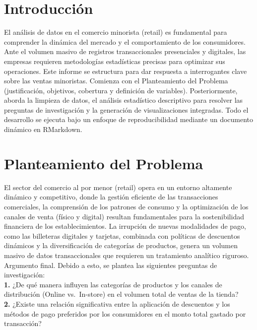 \documentclass[oneside,11pt]{Latex/Classes/PhDthesisPSnPDF}
\begin{document}
\chapter*{Introducción}

El análisis de datos en el comercio minorista (retail) es fundamental
para comprender la dinámica del mercado y el comportamiento de los
consumidores. Ante el volumen masivo de registros transaccionales
presenciales y digitales, las empresas requieren metodologías
estadísticas precisas para optimizar sus operaciones. Este informe se
estructura para dar respuesta a interrogantes clave sobre las ventas
minoristas. Comienza con el Planteamiento del Problema (justificación,
objetivos, cobertura y definición de variables). Posteriormente, aborda
la limpieza de datos, el análisis estadístico descriptivo para resolver
las preguntas de investigación y la generación de visualizaciones
integradas. Todo el desarrollo se ejecuta bajo un enfoque de
reproducibilidad mediante un documento dinámico en RMarkdown.

\chapter{Planteamiento del Problema}

El sector del comercio al por menor (retail) opera en un entorno
altamente dinámico y competitivo, donde la gestión eficiente de las
transacciones comerciales, la comprensión de los patrones de consumo y
la optimización de los canales de venta (físico y digital) resultan
fundamentales para la sostenibilidad financiera de los establecimientos.
La irrupción de nuevas modalidades de pago, como las billeteras
digitales y tarjetas, combinada con políticas de descuentos dinámicos y
la diversificación de categorías de productos, genera un volumen masivo
de datos transaccionales que requieren un tratamiento analítico
riguroso.\\

Argumento final. Debido a esto, se plantea las siguientes preguntas de
investigación:\\

\textbf{1.} ¿De qué manera influyen las categorías de productos y los
canales de distribución (Online vs.~In-store) en el volumen total de
ventas de la tienda?\\

\textbf{2.} ¿Existe una relación significativa entre la aplicación de
descuentos y los métodos de pago preferidos por los consumidores en el
monto total gastado por transacción?\\
\end{document}
